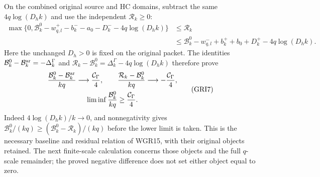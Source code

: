 \documentclass[11pt,a4paper]{article}
\begin{document}
On the combined original source and HC domains, subtract the
same $4q\log(D_hk)$ and use the independent $\mathcal R_k\geq0$:
\[
\begin{aligned}
 \max\{0,\mathcal B_k^0-w^+_{q,l}-b_k^--a_0-D_k^-
                                      -4q\log(D_hk)\}
 &\leq\mathcal R_k\\
 &\leq\mathcal B_k^0-w^-_{q,l}+b_k^++b_0+D_k^+
                                      -4q\log(D_hk).
\end{aligned}\tag{GRI6}
\]
Here the unchanged $D_h>0$ is fixed on the original packet.
The identities $\mathcal B_k^0-\mathcal B_k^{\rm ar}=-\Delta_k^\Gamma$
and $\mathcal R_k-\mathcal B_k^0=\Delta_k^\Gamma-4q\log(D_hk)$
therefore prove
\[
\begin{gathered}
 \frac{\mathcal B_k^0-\mathcal B_k^{\rm ar}}{kq}
                  \longrightarrow\frac{\mathcal C_\Gamma}{4},\qquad
 \frac{\mathcal R_k-\mathcal B_k^0}{kq}
                  \longrightarrow-\frac{\mathcal C_\Gamma}{4},\\
 \liminf\frac{\mathcal B_k^0}{kq}\geq\frac{\mathcal C_\Gamma}{4}.
\end{gathered}\tag{GRI7}
\]
Indeed $4\log(D_hk)/k\to0$, and nonnegativity gives
$\mathcal B_k^0/(kq)\geq(\mathcal B_k^0-\mathcal R_k)/(kq)$
before the lower limit is taken. This is the necessary
baseline and residual relation of WGR15, with their original
objects retained. The next finite-scale calculation concerns
those objects and the full $q$-scale remainder; the proved
negative difference does not set either object equal to zero.
\end{document}
